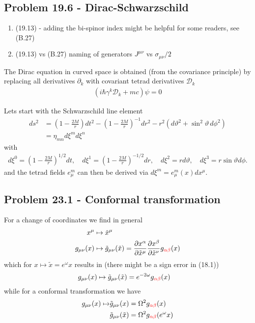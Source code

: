 \documentclass[../main.tex]{subfiles}
\begin{document}
\subsection{Problem 19.6 - Dirac-Schwarzschild}
\begin{enumerate}
    \item (19.13) - adding the bi-spinor index might be helpful for some readers, see (B.27)
    \item (19.13) vs (B.27) naming of generators $J^{\mu\nu}$ vs $\sigma_{\mu\nu}/2$
\end{enumerate}
The Dirac equation in curved space is obtained (from the covariance principle) by replacing all derivatives $\partial_k$ with covariant tetrad derivatives $\mathscr{D}_k$ 
\begin{align}
    (i\hbar\gamma^k\mathscr{D}_k+mc)\psi=0
\end{align}




Lets start with the Schwarzschild line element
\begin{align}
    ds^2&=\left(1-\frac{2M}{r}\right)dt^2-\left(1-\frac{2M}{r}\right)^{-1}dr^2-r^2(d\vartheta^2+\sin^2\vartheta\,d\phi^2)\\
    &=\eta_{mn}d\xi^md\xi^n
\end{align}
with
\begin{align}
    d\xi^0=\left(1-\frac{2M}{r}\right)^{1/2}dt,\quad d\xi^1=\left(1-\frac{2M}{r}\right)^{-1/2}dr,\quad d\xi^2=rd\vartheta,\quad d\xi^3=r\sin\vartheta d\phi.
\end{align}
and the tetrad fields $e^m_\mu$ can then be derived via $d\xi^m=e^m_\mu(x) dx^\mu$.



\subsection{Problem 23.1 - Conformal transformation}
For a change of coordinates we find in general
\begin{align}
    x^\mu&\mapsto\tilde{x}^\mu\\
    g_{\mu\nu}(x)&\mapsto\tilde{g}_{\mu\nu}(\tilde{x})=\frac{\partial x^\alpha}{\partial \tilde x^\mu}\frac{\partial x^\beta}{\partial \tilde x^\nu}g_{\textcolor{red}{\alpha\beta}}(x)
\end{align}
which for $x\mapsto\tilde{x}=e^{\omega}x$ results in (there might be a sign error in (18.1))
\begin{align}
    g_{\mu\nu}(x)&\mapsto\tilde{g}_{\mu\nu}(\tilde{x})=e^{-2\omega}g_{\textcolor{red}{\alpha\beta}}(x)
\end{align}
while for a conformal transformation we have 
\begin{align}
    g_{\mu\nu}(x)\mapsto &\tilde{g}_{\mu\nu}(x)=\Omega^2g_{\textcolor{red}{\alpha\beta}}(x)\\
    &\tilde{g}_{\mu\nu}(\tilde{x})=\Omega^2g_{\textcolor{red}{\alpha\beta}}(e^{\omega}x)
\end{align}
\end{document}
